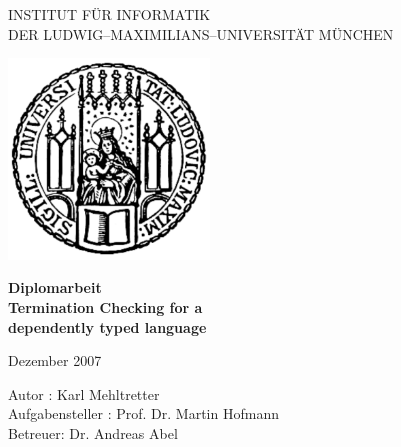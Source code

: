 \documentclass[a4paper,11pt]{report}
\theoremstyle{remark}
\begin{document}
\begin{titlepage}
\begin{center}


\vspace*{-2cm}

{\Huge INSTITUT F\"UR INFORMATIK\\[1mm]} %
DER LUDWIG--MAXIMILIANS--UNIVERSIT\"AT M\"UNCHEN\\

\vspace*{1cm}

\includegraphics[width=0.4\textwidth]{siegel.pdf}

\vspace*{2cm}

{\Large \textbf{Diplomarbeit}}\\

\vspace{2.0cm}
{\Huge \textbf{Termination Checking for a}}\\
\vspace*{3mm}
{\Huge \textbf{dependently typed language}}\\

\vspace{2cm}

\large{Dezember 2007}

\vspace{1.5cm}

  \begin{Large}
      Autor : Karl Mehltretter\\
      Aufgabensteller : Prof. Dr. Martin Hofmann\\
      Betreuer: Dr. Andreas Abel
  \end{Large}

\end{center}
\end{titlepage} 


\end{document}
